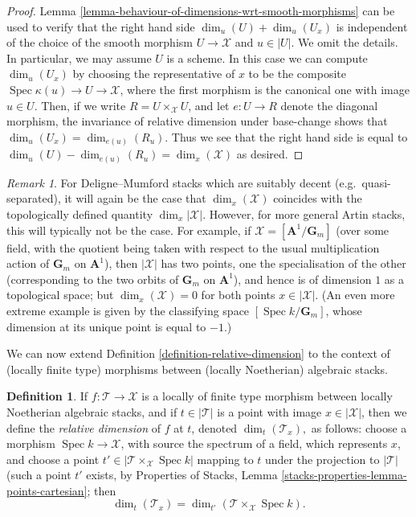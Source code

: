 \documentclass{stacks-project}
\theoremstyle{plain}
\theoremstyle{definition}
\newtheorem{definition}[subsection]{Definition}
\theoremstyle{remark}
\newtheorem{remark}[subsection]{Remark}
\numberwithin{equation}{subsection}
\def\Spec{\mathop{\mathrm{Spec}}}
\begin{document}
\begin{proof}
Lemma \ref{lemma-behaviour-of-dimensions-wrt-smooth-morphisms}
can be used to verify that the right hand side
$\dim_u(U) + \dim_u(U_x)$ is independent of the choice
of the smooth morphism $U \to \mathcal{X}$ and $u \in |U|$.
We omit the details. In particular, we may assume $U$ is a scheme.
In this case we can compute $\dim_u(U_x)$
by choosing the representative of $x$
to be the composite $\Spec \kappa(u) \to U \to \mathcal{X}$, where
the first morphism is the canonical one with image $u \in U$.
Then, if we write $R = U \times_{\mathcal{X}} U$, and let
$e : U \to R$ denote the diagonal morphism, the invariance of
relative dimension under base-change shows that
$\dim_u(U_x) = \dim_{e(u)}(R_u)$. Thus we see that
the right hand side is equal to
$\dim_u (U) - \dim_{e(u)}(R_u) = \dim_x(\mathcal{X})$ as desired.
\end{proof}

\begin{remark}
\label{remark-dimension-DM}
For Deligne--Mumford stacks which are suitably decent
(e.g.\ quasi-separated),
it will again be the case that $\dim_x(\mathcal{X})$ coincides with the
topologically
defined quantity $\dim_x |\mathcal{X}|$.  However, for more general Artin
stacks,
this will typically not be the case.  For example, if
$\mathcal{X} = [\mathbf{A}^1/\mathbf{G}_m]$
(over some field, with the quotient being taken with
respect to the usual multiplication action of $\mathbf{G}_m$ on $\mathbf{A}^1$),
then  $|\mathcal{X}|$ has two points, one the specialisation of the other
(corresponding
to the two orbits of $\mathbf{G}_m$ on $\mathbf{A}^1$), and hence is of
dimension $1$ as
a topological space; but $\dim_x (\mathcal{X}) = 0$ for both points
$x \in |\mathcal{X}|$.
(An even more extreme example is given by the classifying space
$[\Spec k/\mathbf{G}_m]$, whose dimension at its unique point
is equal to $-1$.)
\end{remark}

\noindent
We can now extend Definition \ref{definition-relative-dimension}
to the context of (locally finite type)
morphisms between (locally Noetherian) algebraic stacks.

\begin{definition}
\label{definition-relative-dimension-for-stacks}
If $f : \mathcal{T} \to \mathcal{X}$
is a locally of finite type morphism between
locally Noetherian algebraic stacks, and if
$t \in |\mathcal{T}|$ is a point with image $x \in |\mathcal{X}|$, then
we define the {\it relative dimension} of $f$ at $t$, denoted
$\dim_t(\mathcal{T}_x),$ as follows:
choose a morphism $\Spec k \to \mathcal{X}$, with source the spectrum of
a field, which represents $x$, and choose a point
$t' \in |\mathcal{T} \times_{\mathcal{X}} \Spec k|$
mapping to $t$ under the projection to $|\mathcal{T}|$
(such a point $t'$ exists, by
Properties of Stacks, Lemma
\ref{stacks-properties-lemma-points-cartesian}; then
$$
\dim_t(\mathcal{T}_x) = \dim_{t'}(\mathcal{T} \times_{\mathcal{X}} \Spec k ).
$$
\end{definition}
\end{document}
